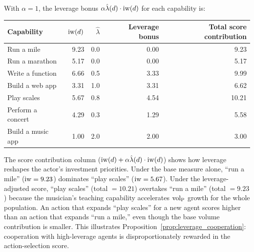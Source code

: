 With $\alpha = 1$, the leverage bonus $\alpha \hat{\lambda}(d) \cdot \operatorname{iw}(d)$
for each capability is:

\begin{center}
\begin{tabular}{@{}lrrrr@{}}
\toprule
\textbf{Capability} & $\operatorname{iw}(d)$ & $\hat{\lambda}$ & Leverage bonus & Total score contribution \\
\midrule
Run a mile        & 9.23 & 0.0 & 0.00 & 9.23 \\
Run a marathon    & 5.17 & 0.0 & 0.00 & 5.17 \\
Write a function  & 6.66 & 0.5 & 3.33 & 9.99 \\
Build a web app   & 3.31 & 1.0 & 3.31 & 6.62 \\
Play scales       & 5.67 & 0.8 & 4.54 & 10.21 \\
Perform a concert & 4.29 & 0.3 & 1.29 & 5.58 \\
Build a music app & 1.00 & 2.0 & 2.00 & 3.00 \\
\bottomrule
\end{tabular}
\end{center}

The score contribution column ($\operatorname{iw}(d) + \alpha \hat{\lambda}(d) \cdot
\operatorname{iw}(d)$) shows how leverage reshapes the actor's investment priorities. Under
the base measure alone, ``run a mile'' ($\operatorname{iw} = 9.23$) dominates ``play
scales'' ($\operatorname{iw} = 5.67$). Under the leverage-adjusted score, ``play scales''
(total $= 10.21$) overtakes ``run a mile'' (total $= 9.23$) because the
musician's teaching capability accelerates ${\operatorname{vol}_{\mathrm{P}}}$ growth for the whole
population. An action that expands ``play scales'' for a new agent scores
higher than an action that expands ``run a mile,'' even though the base
volume contribution is smaller. This illustrates
Proposition~\ref{prop:leverage_cooperation}: cooperation with high-leverage
agents is disproportionately rewarded in the action-selection score.
